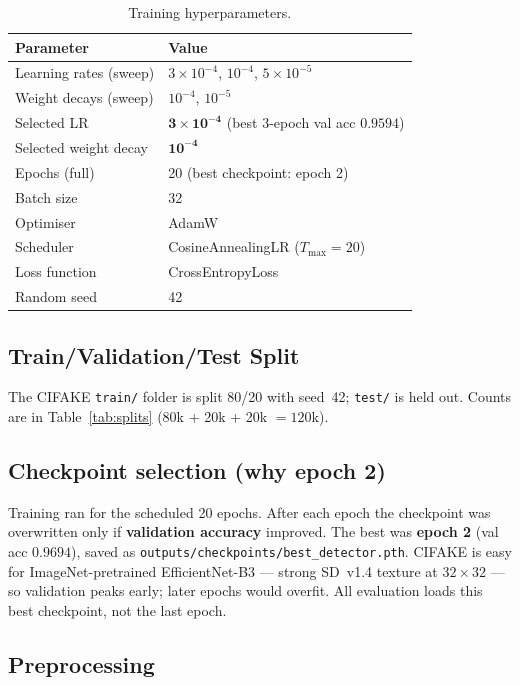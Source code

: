 \documentclass[12pt,a4paper]{article}
\begin{document}
\begin{table}[ht]
\centering
\caption{Training hyperparameters.}
\label{tab:hyperparams}
\begin{tabular}{ll}
\toprule
\textbf{Parameter} & \textbf{Value} \\
\midrule
Learning rates (sweep) & $3\times10^{-4}$, $10^{-4}$, $5\times10^{-5}$ \\
Weight decays (sweep)  & $10^{-4}$, $10^{-5}$ \\
Selected LR            & $\mathbf{3\times10^{-4}}$ (best 3-epoch val acc $0.9594$) \\
Selected weight decay  & $\mathbf{10^{-4}}$ \\
Epochs (full)       & 20 (best checkpoint: epoch 2) \\
Batch size          & 32 \\
Optimiser           & AdamW \\
Scheduler           & CosineAnnealingLR ($T_{\max} = 20$) \\
Loss function       & CrossEntropyLoss \\
Random seed         & 42 \\
\bottomrule
\end{tabular}
\end{table}

\subsection{Train/Validation/Test Split}

The CIFAKE \texttt{train/} folder is split 80/20 with seed~42; \texttt{test/} is held out. Counts are in Table~\ref{tab:splits} (80k + 20k + 20k $= 120$k).

\subsection{Checkpoint selection (why epoch 2)}
\label{sec:epoch2}

Training ran for the scheduled 20 epochs. After each epoch the checkpoint was overwritten only if \textbf{validation accuracy} improved. The best was \textbf{epoch 2} (val acc $0.9694$), saved as \texttt{outputs/checkpoints/best\_detector.pth}. CIFAKE is easy for ImageNet-pretrained EfficientNet-B3 --- strong SD~v1.4 texture at $32\times32$ --- so validation peaks early; later epochs would overfit. All evaluation loads this best checkpoint, not the last epoch.

\subsection{Preprocessing}
\end{document}
